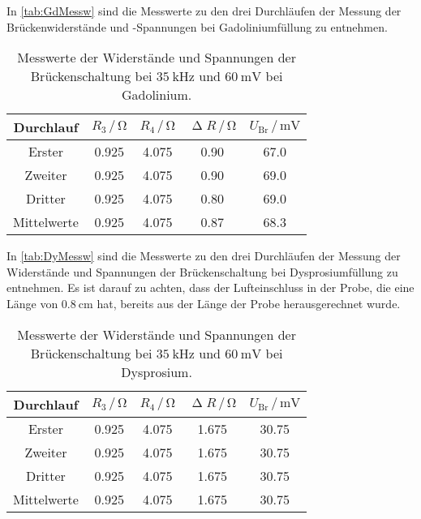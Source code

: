 In \autoref{tab:GdMessw} sind die Messwerte zu den drei Durchläufen der Messung der Brückenwiderstände und -Spannungen bei Gadoliniumfüllung zu entnehmen.
\begin{table}[H]
  \centering
  \caption{Messwerte der Widerstände und Spannungen der Brückenschaltung bei $\SI{35}{\kilo\hertz}$ und $\SI{60}{\milli\volt}$ bei Gadolinium.}
  \label{tab:GdMessw}
  \begin{tabular}{c| c c c c}
    \toprule
    Durchlauf & $R_3 \,/\, \si{\ohm}$ & $R_4 \,/\, \si{\ohm}$ & $\upDelta R \,/\, \si{\ohm}$ & $U_{\text{Br}} \,/\, \si{\milli\volt}$ \\
    \midrule
    Erster & 0.925 & 4.075 & 0.90 & 67.0 \\
    Zweiter & 0.925 & 4.075 & 0.90 & 69.0 \\
    Dritter & 0.925 & 4.075 & 0.80 & 69.0 \\
    Mittelwerte & 0.925 & 4.075 & 0.87 & 68.3\\
    \bottomrule
  \end{tabular}
\end{table}


In \autoref{tab:DyMessw} sind die Messwerte zu den drei Durchläufen der Messung der Widerstände und Spannungen der Brückenschaltung bei Dysprosiumfüllung zu entnehmen. Es ist darauf zu achten,
dass der Lufteinschluss in der Probe, die eine Länge von $\SI{0.8}{\centi\meter}$ hat, bereits aus der Länge der Probe herausgerechnet wurde.
\begin{table}[H]
  \centering
  \caption{Messwerte der Widerstände und Spannungen der Brückenschaltung bei $\SI{35}{\kilo\hertz}$ und $\SI{60}{\milli\volt}$ bei Dysprosium.}
  \label{tab:DyMessw}
  \begin{tabular}{c| c c c c}
    \toprule
    Durchlauf & $R_3 \,/\, \si{\ohm}$ & $R_4 \,/\, \si{\ohm}$ & $\upDelta R \,/\, \si{\ohm}$ & $U_{\text{Br}} \,/\, \si{\milli\volt}$ \\
    \midrule
    Erster & 0.925 & 4.075 & 1.675 & 30.75 \\
    Zweiter & 0.925 & 4.075 & 1.675 & 30.75 \\
    Dritter & 0.925 & 4.075 & 1.675 & 30.75 \\
    Mittelwerte & 0.925 & 4.075 & 1.675 & 30.75 \\
    \bottomrule
  \end{tabular}
\end{table}

